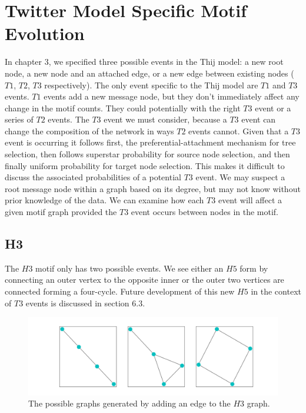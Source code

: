 \chapter{Twitter Model Specific Motif Evolution}

In chapter 3, we specified three possible
events in the Thij model: a new root node, a new node and an attached edge, or a new edge between existing nodes 
($T1$, $T2$, $T3$ respectively). The only event specific to the Thij model are $T1$ and $T3$ events. 
$T1$ events add a new message node, but they don't immediately affect any change in the motif counts.
They could potentially with the right $T3$ event or a series of $T2$ events. The $T3$ event we must consider, because
 a $T3$ event can change the composition of the network in ways $T2$ events cannot. Given that a $T3$ event is
occurring it follows first, the preferential-attachment mechanism for tree selection, then follows superstar 
probability for source node selection, and then finally uniform probability for target node selection.
This makes it difficult
to discuss the associated probabilities of a potential $T3$ event. We may suspect
a root message node within a graph based on its degree, but may not know without prior knowledge
of the data. We can examine how each $T3$ event will affect a given motif graph provided the $T3$
event occurs between nodes in the motif.

\section{H3}
The $H3$ motif only has two possible events. We see either an $H5$ form by connecting
an outer vertex to the opposite inner or the outer two vertices are connected
forming a four-cycle. Future development of this new $H5$ in the context of 
$T3$ events is discussed in section 6.3. 

\begin{figure}[!ht]
    \includegraphics[width=15cm]{Images/H3_T3_evolution.png}
    \centering
    \caption{The possible graphs generated by adding an edge to the $H3$ graph.}
\end{figure}


